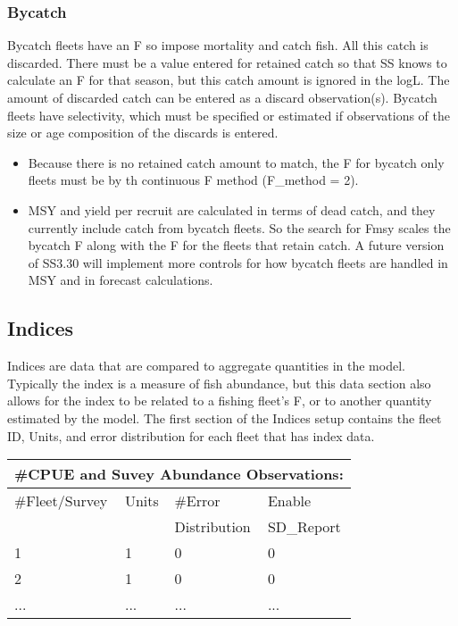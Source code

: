 \subsubsection{Bycatch}
Bycatch fleets have an F so impose mortality and catch fish.  All this catch is discarded.  There must be a value entered for retained catch so that SS knows to calculate an F for that season, but this catch amount is ignored in the logL.  The amount of discarded catch can be entered as a discard observation(s).  Bycatch fleets have selectivity, which must be specified or estimated if observations of the size or age composition of the discards is entered.
\begin{itemize}
	\item Because there is no retained catch amount to match, the F for bycatch only fleets must be by th continuous F method  (F\_method = 2).
	\item  MSY and yield per recruit are calculated in terms of dead catch, and they currently include catch from bycatch fleets.  So the search for Fmsy scales the bycatch F along with the F for the fleets that retain catch.  A future version of SS3.30 will implement more controls for how bycatch fleets are handled in MSY and in forecast calculations. 
\end{itemize}

\subsection{Indices}
Indices are data that are compared to aggregate quantities in the model.  Typically the index is a measure of fish abundance, but this data section also allows for the index to be related to a fishing fleet's F, or to another quantity estimated by the model.  The first section of the Indices setup contains the fleet ID, Units, and error distribution for each fleet that has index data.

\begin{center}
	\begin{tabular}{p{3cm} p{2cm} p{3cm} p{3cm}}
		\multicolumn{4}{l}{\#CPUE and Suvey Abundance Observations:}\\
		\hline
		\#Fleet/Survey & Units & \#Error      & Enable \\
		               &       & Distribution & SD\_Report \\
		\hline
		1 & 1 & 0 & 0 \\
		2 & 1 & 0 & 0 \\
		... & ... & ... & ... \\
		\hline
	\end{tabular}		
\end{center}


